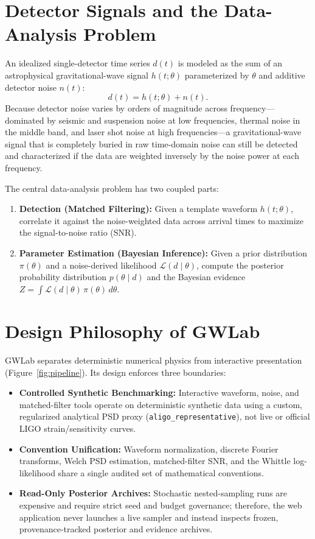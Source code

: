 \documentclass[11pt,a4paper]{report}
\begin{document}
\section{Detector Signals and the Data-Analysis Problem}
An idealized single-detector time series $d(t)$ is modeled as the sum of an astrophysical gravitational-wave signal $h(t; \theta)$ parameterized by $\theta$ and additive detector noise $n(t)$:
\begin{equation}
d(t) = h(t; \theta) + n(t).
\end{equation}
Because detector noise varies by orders of magnitude across frequency---dominated by seismic and suspension noise at low frequencies, thermal noise in the middle band, and laser shot noise at high frequencies---a gravitational-wave signal that is completely buried in raw time-domain noise can still be detected and characterized if the data are weighted inversely by the noise power at each frequency.

The central data-analysis problem has two coupled parts:
\begin{enumerate}[leftmargin=1.5em]
    \item \textbf{Detection (Matched Filtering):} Given a template waveform $h(t; \theta)$, correlate it against the noise-weighted data across arrival times to maximize the signal-to-noise ratio (SNR).
    \item \textbf{Parameter Estimation (Bayesian Inference):} Given a prior distribution $\pi(\theta)$ and a noise-derived likelihood $\mathcal{L}(d \mid \theta)$, compute the posterior probability distribution $p(\theta \mid d)$ and the Bayesian evidence $Z = \int \mathcal{L}(d \mid \theta)\,\pi(\theta)\,d\theta$.
\end{enumerate}

\section{Design Philosophy of GWLab}
GWLab separates deterministic numerical physics from interactive presentation (Figure~\ref{fig:pipeline}). Its design enforces three boundaries:
\begin{itemize}[leftmargin=1.5em]
    \item \textbf{Controlled Synthetic Benchmarking:} Interactive waveform, noise, and matched-filter tools operate on deterministic synthetic data using a custom, regularized analytical PSD proxy (\texttt{aligo\_representative}), not live or official LIGO strain/sensitivity curves.
    \item \textbf{Convention Unification:} Waveform normalization, discrete Fourier transforms, Welch PSD estimation, matched-filter SNR, and the Whittle log-likelihood share a single audited set of mathematical conventions.
    \item \textbf{Read-Only Posterior Archives:} Stochastic nested-sampling runs are expensive and require strict seed and budget governance; therefore, the web application never launches a live sampler and instead inspects frozen, provenance-tracked posterior and evidence archives.
\end{itemize}
\end{document}
